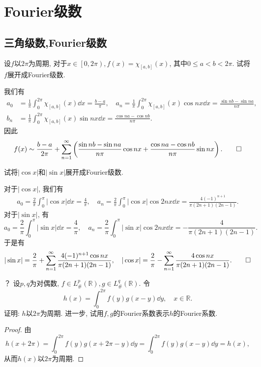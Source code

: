 \chapter{Fourier级数}
\section{三角级数,Fourier级数}

\begin{quiza}
\woe 设\(f\)以\(2\pi\)为周期, 对于\(x\in\left[0,2\pi\right),f(x)=\chi_{[a,b]}(x)\), 其中\(0\leqslant a<b<2\pi\). 试将\(f\)展开成Fourier级数.
\begin{solution}
我们有\[\begin{split}
a_0&=\frac{1}{\pi}\int_{0}^{2\pi}\chi_{[a,b]}(x)\dd x=\frac{b-a}{\pi},\quad a_n=\frac{1}{\pi}\int_{0}^{2\pi}\chi_{[a,b]}(x)\cos nx\dd x=\frac{\sin nb-\sin na}{n\pi},\\b_n&=\frac{1}{\pi}\int_{0}^{2\pi}\chi_{[a,b]}(x)\sin nx\dd x=\frac{\cos na-\cos nb}{n\pi}.
\end{split}\]因此\[f(x)\sim \frac{b-a}{2\pi}+\sum_{n=1}^{\infty}\left(\frac{\sin nb-\sin na}{n\pi}\cos nx+\frac{\cos na-\cos nb}{n\pi}\sin nx\right).\qedhere\]
\end{solution}
\woe 试将\(\left|\cos x\right|\)和\(\left|\sin x\right|\)展开成Fourier级数.
\begin{solution}
	对于\(|\cos x|\), 我们有\[\begin{split}
a_0=\frac{2}{\pi}\int_{0}^{\pi}|\cos x|\dd x=\frac{4}{\pi},\quad a_n=\frac{2}{\pi}\int_{0}^{\pi}|\cos x|\cos 2nx\dd x=\frac{4(-1)^{n+1}}{\pi(2n+1)(2n-1)}.
\end{split}\]对于\(|\sin x|\), 有\[a_0=\frac{2}{\pi}\int_{0}^{\pi}|\sin x|\dd x=\frac{4}{\pi},\quad a_n=\frac{2}{\pi}\int_{0}^{\pi}|\sin x|\cos 2nx\dd x=-\frac{4}{\pi(2n+1)(2n-1)}.\]于是有\[|\sin x|=\frac{2}{\pi}+\sum_{n=1}^{\infty}\frac{4(-1)^{n+1}\cos nx}{\pi(2n+1)(2n-1)},\quad
|\cos x|=\frac{2}{\pi}-\sum_{n=1}^{\infty}\frac{4\cos nx}{\pi(2n+1)(2n-1)}.\qedhere\]
\end{solution}
？
\woe 设\(p,q\)为对偶数, \(f\in L^p_{\#}\left(\mathbb{\mathbb{R}}\right), g\in L_{\#}^q\left(\mathbb{R}\right)\). 令\[h(x)=\int_{0}^{2\pi}f(y)g(x-y)\dd y,\quad x\in\mathbb{R}.\]证明: \(h\)以\(2\pi\)为周期. 进一步, 试用\(f,g\)的Fourier系数表示\(h\)的Fourier系数.
\begin{proof}
由\[h(x+2\pi)=\int_{0}^{2\pi}f(y)g(x+2\pi-y)\dd y=\int_{0}^{2\pi}f(y)g(x-y)\dd y=h(x),\]从而\(h(x)\)以\(2\pi\)为周期.


\end{proof}
\end{quiza}
